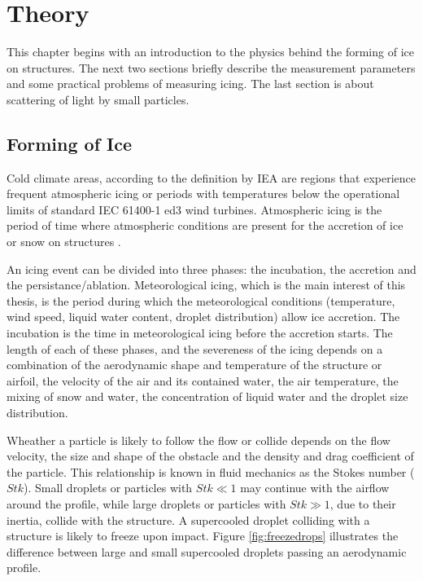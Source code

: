 
\chapter{Theory}
\label{chap:theory}

This chapter begins with an introduction to the physics behind the forming of ice on structures. The next two sections briefly describe the measurement parameters and some practical problems of measuring icing. The last section is about scattering of light by small particles.

\section{Forming of Ice}

Cold climate areas, according to the definition by IEA \cite{iea2017} are regions that experience frequent atmospheric icing or periods with temperatures below the operational limits of standard IEC 61400-1 ed3
wind turbines. Atmospheric icing is the period of time where atmospheric conditions are present for the accretion of ice or snow on structures \cite{iea2017}.

An icing event can be divided into three phases: the incubation, the accretion and the persistance/ablation. Meteorological icing, which is the main interest of this thesis, is the period during which the meteorological conditions (temperature, wind speed, liquid water content, droplet distribution) allow ice accretion. The incubation is the time in meteorological icing before the accretion starts. The length of each of these phases, and the severeness of the icing depends on a combination of the aerodynamic shape and temperature of the structure or airfoil, the velocity of the air and its contained water, the air temperature, the mixing of snow and water, the concentration of liquid water and the droplet size distribution.

Wheather a particle is likely to follow the flow or collide depends on the flow velocity, the size and shape of the obstacle and the density and drag coefficient of the particle. This relationship is known in fluid mechanics as the Stokes number ($Stk$). Small droplets or particles with $Stk \ll1$ may continue with the airflow around the profile, while large droplets or particles with $Stk \gg 1$, due to their inertia, collide with the structure. A supercooled droplet colliding with a structure is likely to freeze upon impact. Figure \ref{fig:freezedrops} illustrates the difference between large and small supercooled droplets passing an aerodynamic profile.

